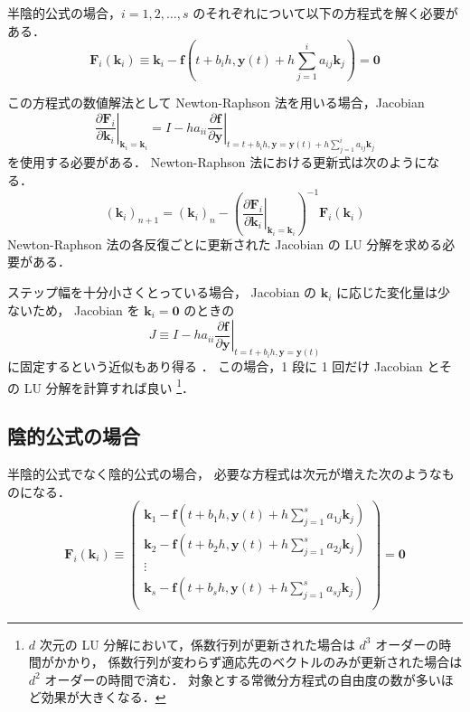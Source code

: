 半陰的公式の場合，$i = 1, 2, \ldots, s$ のそれぞれについて以下の方程式を解く必要がある．
\begin{equation}
    \bm{F}_i(\bm{k}_i)
    \equiv \bm{k}_i - \bm{f}\left(t + b_i h, \bm{y}(t) + h \sum_{j = 1}^i a_{ij} \bm{k}_j \right)
    = \bm{0}
\end{equation}

この方程式の数値解法として
Newton-Raphson 法を用いる場合，Jacobian
\begin{equation}
    \left. \frac{\partial \bm{F}_i}{\partial \bm{k}_i} \right|_{\bm{k}_i = \bm{k}_i}
    = I - h a_{ii}
    \left. \frac{\partial \bm{f}}{\partial \bm{y}}
    \right|_{t = t + b_i h, \bm{y} = \bm{y}(t) + h \sum_{j = 1}^i a_{ij} \bm{k}_j}
\end{equation}
を使用する必要がある．
Newton-Raphson 法における更新式は次のようになる．
\begin{equation}
    (\bm{k}_i)_{n+1} = (\bm{k}_i)_{n}
    - \left(\left. \frac{\partial \bm{F}_i}{\partial \bm{k}_i} \right|_{\bm{k}_i = \bm{k}_i}\right)^{-1}
    \bm{F}_i(\bm{k}_i)
\end{equation}
Newton-Raphson 法の各反復ごとに更新された Jacobian の LU 分解を求める必要がある．

ステップ幅を十分小さくとっている場合，
Jacobian の $\bm{k}_i$ に応じた変化量は少ないため，
Jacobian を $\bm{k}_i = \bm{0}$ のときの
\begin{equation}
    J \equiv I - h a_{ii}
    \left. \frac{\partial \bm{f}}{\partial \bm{y}}
    \right|_{t = t + b_i h, \bm{y} = \bm{y}(t)}
\end{equation}
に固定するという近似もあり得る
\cite[6.2 節 (c)]{Mitsui1993}．
この場合，1 段に 1 回だけ Jacobian とその LU 分解を計算すれば良い
\footnote{$d$ 次元の LU 分解において，係数行列が更新された場合は $d^3$ オーダーの時間がかかり，%
    係数行列が変わらず適応先のベクトルのみが更新された場合は $d^2$ オーダーの時間で済む．%
    対象とする常微分方程式の自由度の数が多いほど効果が大きくなる．}．

\subsection{陰的公式の場合}

半陰的公式でなく陰的公式の場合，
必要な方程式は次元が増えた次のようなものになる．
\begin{equation}
    \bm{F}_i(\bm{k}_i)
    \equiv
    \begin{pmatrix}
        \bm{k}_1 - \bm{f}\left(t + b_1 h, \bm{y}(t) + h \sum_{j = 1}^s a_{1j} \bm{k}_j \right) \\
        \bm{k}_2 - \bm{f}\left(t + b_2 h, \bm{y}(t) + h \sum_{j = 1}^s a_{2j} \bm{k}_j \right) \\
        \vdots                                                                                 \\
        \bm{k}_s - \bm{f}\left(t + b_s h, \bm{y}(t) + h \sum_{j = 1}^s a_{sj} \bm{k}_j \right) \\
    \end{pmatrix}
    = \bm{0}
\end{equation}

